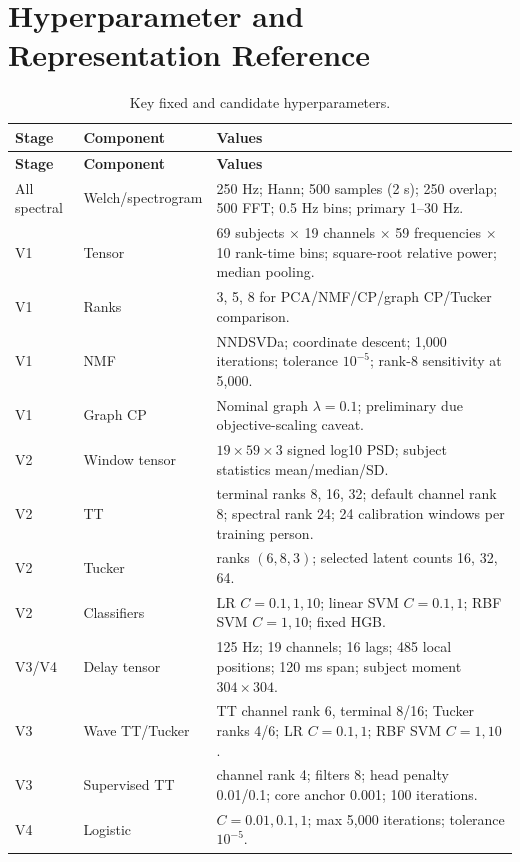 \chapter{Hyperparameter and Representation Reference}
\label{app:hyperparameters}

\begin{longtable}{p{}p{}p{}}
\caption{Key fixed and candidate hyperparameters.}
\label{tab:hyperparameters}\\
\toprule
\textbf{Stage} & \textbf{Component} & \textbf{Values}\\
\midrule
\endfirsthead
\toprule
\textbf{Stage} & \textbf{Component} & \textbf{Values}\\
\midrule
\endhead
All spectral & Welch/spectrogram & 250 Hz; Hann; 500 samples (2 s); 250 overlap; 500 FFT; 0.5 Hz bins; primary 1--30 Hz.\\
V1 & Tensor & 69 subjects $\times$ 19 channels $\times$ 59 frequencies $\times$ 10 rank-time bins; square-root relative power; median pooling.\\
V1 & Ranks & 3, 5, 8 for PCA/NMF/CP/graph CP/Tucker comparison.\\
V1 & NMF & NNDSVDa; coordinate descent; 1,000 iterations; tolerance $10^{-5}$; rank-8 sensitivity at 5,000.\\
V1 & Graph CP & Nominal graph $\lambda=0.1$; preliminary due objective-scaling caveat.\\
V2 & Window tensor & $19\times59\times3$ signed log10 PSD; subject statistics mean/median/SD.\\
V2 & TT & terminal ranks 8, 16, 32; default channel rank 8; spectral rank 24; 24 calibration windows per training person.\\
V2 & Tucker & ranks $(6,8,3)$; selected latent counts 16, 32, 64.\\
V2 & Classifiers & LR $C=0.1,1,10$; linear SVM $C=0.1,1$; RBF SVM $C=1,10$; fixed HGB.\\
V3/V4 & Delay tensor & 125 Hz; 19 channels; 16 lags; 485 local positions; 120 ms span; subject moment $304\times304$.\\
V3 & Wave TT/Tucker & TT channel rank 6, terminal 8/16; Tucker ranks 4/6; LR $C=0.1,1$; RBF SVM $C=1,10$.\\
V3 & Supervised TT & channel rank 4; filters 8; head penalty 0.01/0.1; core anchor 0.001; 100 iterations.\\
V4 & Logistic & $C=0.01,0.1,1$; max 5,000 iterations; tolerance $10^{-5}$.\\

\end{longtable}
